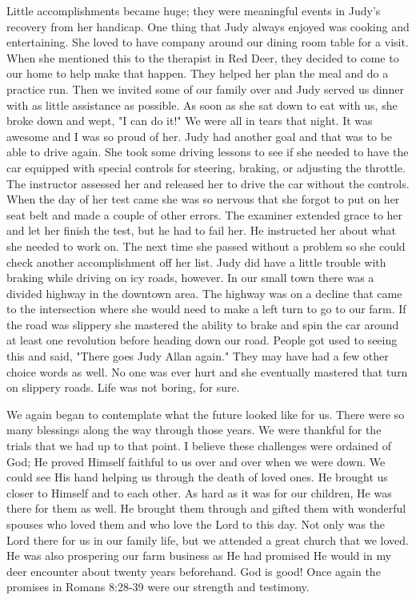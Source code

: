 \documentclass[twoside, 12pt]{book}
\begin{document}
Little accomplishments became huge; they were meaningful events in Judy’s recovery from her handicap. One thing that Judy always enjoyed was cooking and entertaining. She loved to have company around our dining room table for a visit. When she mentioned this to the therapist in Red Deer, they decided to come to our home to help make that happen. They helped her plan the meal and do a practice run. Then we invited some of our family over and Judy served us dinner with as little assistance as possible. As soon as she sat down to eat with us, she broke down and wept, "I can do it!" We were all in tears that night. It was awesome and I was so proud of her. Judy had another goal and that was to be able to drive again. She took some driving lessons to see if she needed to have the car equipped with special controls for steering, braking, or adjusting the throttle. The instructor assessed her and released her to drive the car without the controls. When the day of her test came she was so nervous that she forgot to put on her seat belt and made a couple of other errors. The examiner extended grace to her and let her finish the test, but he had to fail her. He instructed her about what she needed to work on. The next time she passed without a problem so she could check another accomplishment off her list. Judy did have a little trouble with braking while driving on icy roads, however. In our small town there was a divided highway in the downtown area. The highway was on a decline that came to the intersection where she would need to make a left turn to go to our farm. If the road was slippery she mastered the ability to brake and spin the car around at least one revolution before heading down our road. People got used to seeing this and said, "There goes Judy Allan again." They may have had a few other choice words as well. No one was ever hurt and she eventually mastered that turn on slippery roads. Life was not boring, for sure.

We again began to contemplate what the future looked like for us. There were so many blessings along the way through those years. We were thankful for the trials that we had up to that point. I believe these challenges were ordained of God; He proved Himself faithful to us over and over when we were down. We could see His hand helping us through the death of loved ones. He brought us closer to Himself and to each other. As hard as it was for our children, He was there for them as well. He brought them through and gifted them with wonderful spouses who loved them and who love the Lord to this day. Not only was the Lord there for us in our family life, but we attended a great church that we loved. He was also prospering  our farm business as He had promised He would in my deer encounter about twenty years beforehand. God is good! Once again the promises in Romans 8:28-39 were our strength and testimony.
\end{document}
